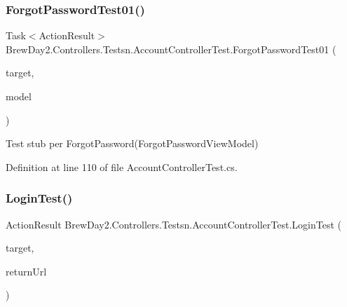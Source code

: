 \mbox{\label{class_brew_day2_1_1_controllers_1_1_testsn_1_1_account_controller_test_a49f31e771b31adc805ecb0cb6978475b}} 
\subsubsection{\texorpdfstring{Forgot\+Password\+Test01()}{ForgotPasswordTest01()}}
{\footnotesize\ttfamily Task$<$Action\+Result$>$ Brew\+Day2.\+Controllers.\+Testsn.\+Account\+Controller\+Test.\+Forgot\+Password\+Test01 (\begin{DoxyParamCaption}\item[{\mbox{[}\+Pex\+Assume\+Under\+Test\mbox{]} \mbox{\hyperlink{class_brew_day2_1_1_controllers_1_1_account_controller}{Account\+Controller}}}]{target,  }\item[{\mbox{\hyperlink{class_brew_day2_1_1_models_1_1_forgot_password_view_model}{Forgot\+Password\+View\+Model}}}]{model }\end{DoxyParamCaption})}



Test stub per Forgot\+Password(\+Forgot\+Password\+View\+Model)



Definition at line 110 of file Account\+Controller\+Test.\+cs.

\mbox{\label{class_brew_day2_1_1_controllers_1_1_testsn_1_1_account_controller_test_a82679cecb570fc7c10e4a8fab11075d2}} 
\subsubsection{\texorpdfstring{Login\+Test()}{LoginTest()}}
{\footnotesize\ttfamily Action\+Result Brew\+Day2.\+Controllers.\+Testsn.\+Account\+Controller\+Test.\+Login\+Test (\begin{DoxyParamCaption}\item[{\mbox{[}\+Pex\+Assume\+Under\+Test\mbox{]} \mbox{\hyperlink{class_brew_day2_1_1_controllers_1_1_account_controller}{Account\+Controller}}}]{target,  }\item[{string}]{return\+Url }\end{DoxyParamCaption})}



